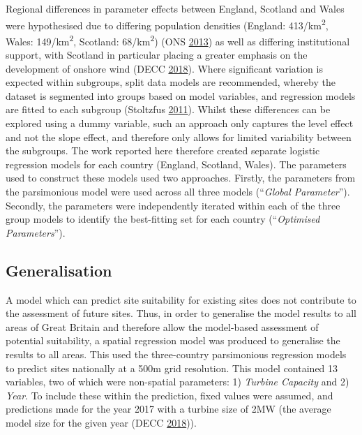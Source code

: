 \documentclass[a4paper,]{article}
\theoremstyle{definition}
\theoremstyle{definition}
\theoremstyle{definition}
\theoremstyle{remark}
\begin{document}
Regional differences in parameter effects between England, Scotland and
Wales were hypothesised due to differing population densities (England:
413/km\textsuperscript{2}, Wales: 149/km\textsuperscript{2}, Scotland:
68/km\textsuperscript{2}) (ONS \protect\hyperlink{ref-ONS2013}{2013}) as
well as differing institutional support, with Scotland in particular
placing a greater emphasis on the development of onshore wind (DECC
\protect\hyperlink{ref-DECC2018}{2018}). Where significant variation is
expected within subgroups, split data models are recommended, whereby
the dataset is segmented into groups based on model variables, and
regression models are fitted to each subgroup (Stoltzfus
\protect\hyperlink{ref-Stoltzfus2011}{2011}). Whilst these differences
can be explored using a dummy variable, such an approach only captures
the level effect and not the slope effect, and therefore only allows for
limited variability between the subgroups. The work reported here
therefore created separate logistic regression models for each country
(England, Scotland, Wales). The parameters used to construct these
models used two approaches. Firstly, the parameters from the
parsimonious model were used across all three models (``\emph{Global
Parameter}''). Secondly, the parameters were independently iterated
within each of the three group models to identify the best-fitting set
for each country (``\emph{Optimised Parameters}'').

\hypertarget{generalisation}{%
\subsection{Generalisation}\label{generalisation}}

A model which can predict site suitability for existing sites does not
contribute to the assessment of future sites. Thus, in order to
generalise the model results to all areas of Great Britain and therefore
allow the model-based assessment of potential suitability, a spatial
regression model was produced to generalise the results to all areas.
This used the three-country parsimonious regression models to predict
sites nationally at a 500m grid resolution. This model contained 13
variables, two of which were non-spatial parameters: 1) \emph{Turbine
Capacity} and 2) \emph{Year}. To include these within the prediction,
fixed values were assumed, and predictions made for the year 2017 with a
turbine size of 2MW (the average model size for the given year (DECC
\protect\hyperlink{ref-DECC2018}{2018})).
\end{document}
